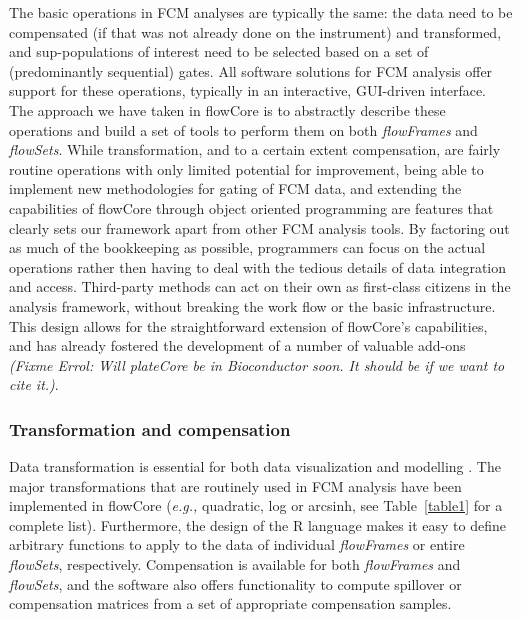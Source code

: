 \documentclass[12pt]{article}
\newcommand{\Rpackage}[1]{{\textsf{#1}}}
\newcommand{\Rclass}[1]{{\textit{#1}}}
\begin{document}
The basic operations in FCM analyses are typically the same: the data
need to be compensated (if that was not already done on the
instrument) and transformed, and sup-populations of interest need to
be selected based on a set of (predominantly sequential) gates. All
software solutions for FCM analysis offer support for these
operations, typically in an interactive, GUI-driven interface. The
approach we have taken in \Rpackage{flowCore} is to abstractly
describe these operations and build a set of tools to perform them on
both \Rclass{flowFrames} and \Rclass{flowSets}. While transformation,
and to a certain extent compensation, are fairly routine operations
with only limited potential for improvement, being able to implement
new methodologies for gating of FCM data, and extending the
capabilities of \Rpackage{flowCore} through object oriented
programming are features that clearly sets our framework apart from
other FCM analysis tools. By factoring out as much of the bookkeeping
as possible, programmers can focus on the actual operations rather
then having to deal with the tedious details of data integration and
access. Third-party methods can act on their own as first-class
citizens in the analysis framework, without breaking the work flow or
the basic infrastructure. This design allows for the straightforward
extension of \Rpackage{flowCore}'s capabilities, and has already
fostered the development of a number of valuable add-ons
\citep{lo2008agf,sarkar2008ufv} \textit{(Fixme Errol: Will plateCore
  be in Bioconductor soon. It should be if we want to cite it.)}.

\subsubsection*{Transformation and compensation}

Data transformation is essential for both data visualization and
modelling \citep{lo2008agf}. The major transformations that are
routinely used in FCM analysis have been implemented in
\Rpackage{flowCore} (\textit{e.g.,} quadratic, log or arcsinh, see
Table~\ref{table1} for a complete list). Furthermore, the design of
the R language makes it easy to define arbitrary functions to apply to
the data of individual \Rclass{flowFrames} or entire
\Rclass{flowSets}, respectively. Compensation is available for both
\Rclass{flowFrames} and \Rclass{flowSets}, and the software also
offers functionality to compute spillover or compensation matrices
from a set of appropriate compensation samples.
\end{document}
